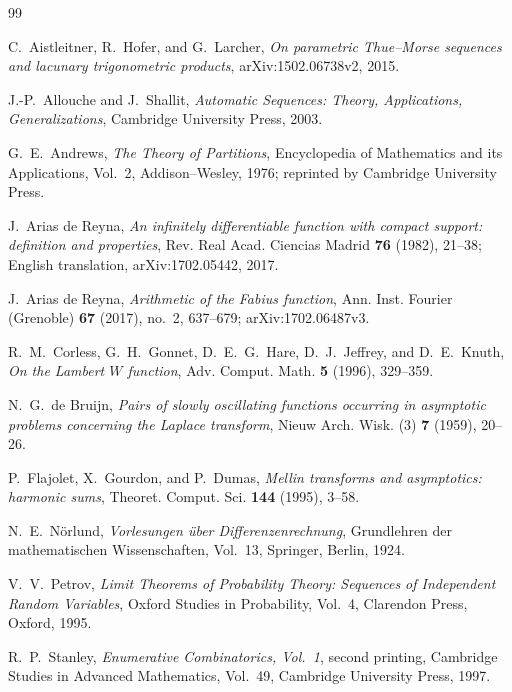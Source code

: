 \documentclass[11pt,oneside]{article}
\numberwithin{equation}{section}
\theoremstyle{definition}
\theoremstyle{remark}
\begin{document}
\begin{thebibliography}{99}

C.~Aistleitner, R.~Hofer, and G.~Larcher,
\emph{On parametric Thue--Morse sequences and lacunary trigonometric products},
arXiv:1502.06738v2, 2015.

J.-P.~Allouche and J.~Shallit,
\emph{Automatic Sequences: Theory, Applications, Generalizations},
Cambridge University Press, 2003.

G.~E.~Andrews,
\emph{The Theory of Partitions},
Encyclopedia of Mathematics and its Applications, Vol.~2,
Addison--Wesley, 1976; reprinted by Cambridge University Press.

J.~Arias de Reyna,
\emph{An infinitely differentiable function with compact support: definition and
properties}, Rev. Real Acad. Ciencias Madrid \textbf{76} (1982), 21--38;
English translation, arXiv:1702.05442, 2017.

J.~Arias de Reyna,
\emph{Arithmetic of the Fabius function},
Ann. Inst. Fourier (Grenoble) \textbf{67} (2017), no.~2, 637--679;
arXiv:1702.06487v3.

R.~M.~Corless, G.~H.~Gonnet, D.~E.~G.~Hare, D.~J.~Jeffrey, and D.~E.~Knuth,
\emph{On the Lambert $W$ function},
Adv. Comput. Math. \textbf{5} (1996), 329--359.

N.~G.~de Bruijn,
\emph{Pairs of slowly oscillating functions occurring in asymptotic problems concerning
the Laplace transform},
Nieuw Arch. Wisk. (3) \textbf{7} (1959), 20--26.

P.~Flajolet, X.~Gourdon, and P.~Dumas,
\emph{Mellin transforms and asymptotics: harmonic sums},
Theoret. Comput. Sci. \textbf{144} (1995), 3--58.

N.~E.~N\"orlund,
\emph{Vorlesungen \"uber Differenzenrechnung},
Grundlehren der mathematischen Wissenschaften, Vol.~13,
Springer, Berlin, 1924.

V.~V.~Petrov,
\emph{Limit Theorems of Probability Theory: Sequences of Independent Random Variables},
Oxford Studies in Probability, Vol.~4, Clarendon Press, Oxford, 1995.

R.~P.~Stanley,
\emph{Enumerative Combinatorics, Vol.~1}, second printing,
Cambridge Studies in Advanced Mathematics, Vol.~49,
Cambridge University Press, 1997.


\end{thebibliography}
\end{document}
